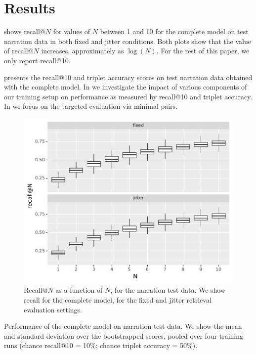 \section{Results}
\label{sec:results}

 shows recall@$N$ for values of $N$
between 1 and 10 for the complete model on test narration data in both 
{\sc fixed} and {\sc jitter} conditions. Both plots show that the value of 
recall@$N$ increases, approximately as $\log(N)$. For the rest 
of this paper, we only report recall@10.

 presents the recall@10 and triplet accuracy
scores on test narration data obtained with the complete
model. In  we investigate the impact
of various components of our training setup on performance as measured
by recall@10 and triplet accuracy.  In  we
focus on the targeted evaluation via minimal pairs.



\begin{figure}[htb]
  \centering
  \includegraphics[width=\columnwidth]{results/recall_at_1_to_n_test.pdf}
  \caption{Recall@$N$ as a function of $N$, for the narration test
    data. We show recall for the complete model, for the {\sc fixed} and {\sc jitter}
    retrieval evaluation settings. }
  \label{fig:recall_at_1_to_n}
\end{figure}

\begin{table}[htb]
  
  \caption{Performance of the complete model on narration test
  	data. We show the mean and standard deviation over the
  	bootstrapped scores, pooled over four training runs
	(chance recall@10 = 10\%; chance triplet accuracy = 50\%).}
  \label{tab:test_scores}
\end{table}



